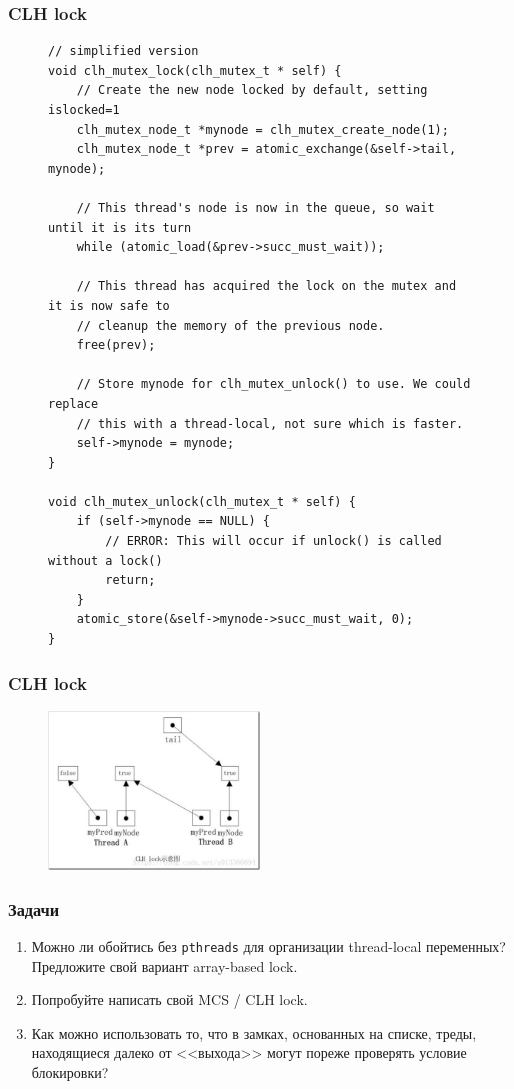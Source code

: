 \documentclass[aspectratio=169, pdf, 8pt, unicode]{beamer}
\begin{document}
\begin{frame}[fragile]
\frametitle{CLH lock}
\begin{figure}[H]
\begin{minipage}{0.8\textwidth}
\small
\begin{verbatim}
// simplified version
void clh_mutex_lock(clh_mutex_t * self) {
    // Create the new node locked by default, setting islocked=1
    clh_mutex_node_t *mynode = clh_mutex_create_node(1);
    clh_mutex_node_t *prev = atomic_exchange(&self->tail, mynode);

    // This thread's node is now in the queue, so wait until it is its turn
    while (atomic_load(&prev->succ_must_wait));

    // This thread has acquired the lock on the mutex and it is now safe to
    // cleanup the memory of the previous node.
    free(prev);

    // Store mynode for clh_mutex_unlock() to use. We could replace
    // this with a thread-local, not sure which is faster.
    self->mynode = mynode;
}

void clh_mutex_unlock(clh_mutex_t * self) {
    if (self->mynode == NULL) {
        // ERROR: This will occur if unlock() is called without a lock()
        return;
    }
    atomic_store(&self->mynode->succ_must_wait, 0);
}
\end{verbatim}
\end{minipage}
\end{figure}
\end{frame}

\begin{frame}[fragile]
\frametitle{CLH lock}
\begin{figure}[H]
\includegraphics[width=0.5\textwidth]{fig/clh.jpeg}
\end{figure}
\end{frame}

\begin{frame}
\frametitle{Задачи}
\begin{enumerate}
\item Можно ли обойтись без \texttt{pthreads} для организации thread-local переменных? Предложите свой вариант array-based lock.
\item Попробуйте написать свой MCS / CLH lock.
\item Как можно использовать то, что в замках, основанных на списке, треды, находящиеся далеко от <<выхода>> могут пореже проверять условие блокировки? 
\end{enumerate}

\end{frame}
\end{document}
